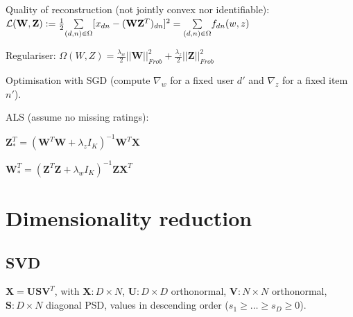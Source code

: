 Quality of reconstruction (not jointly convex nor identifiable):\newline $\mathcal{L}(\mathbf{W}, \mathbf{Z}) := \frac{1}{2} \underset{(d,n)\in \Omega}{\sum} [x_{dn} - (\mathbf{W}\mathbf{Z}^T)_{dn}]^2 \newline= \underset{(d,n)\in \Omega}{\sum} f_{dn}(w,z)$

Regulariser: $\Omega(W,Z) = \frac{\lambda_w}{2} ||\mathbf{W}||^2_{Frob} + \frac{\lambda_z}{2} ||\mathbf{Z}||^2_{Frob}$

Optimisation with SGD (compute $\nabla_w$ for a fixed user $d'$ and $\nabla_z$ for a fixed item $n'$). 

ALS (assume no missing ratings):

$\mathbf{Z}^T_* = (\mathbf{W}^T\mathbf{W} + \lambda_z I_K)^{-1} \mathbf{W}^T \mathbf{X}$

$\mathbf{W}^T_* = (\mathbf{Z}^T\mathbf{Z} + \lambda_w I_K)^{-1} \mathbf{Z} \mathbf{X}^T$


\section{Dimensionality reduction}
\subsection{SVD}
$\mathbf{X} = \mathbf{U} \mathbf{S} \mathbf{V}^T$, with $\mathbf{X}: D\times N$, $\mathbf{U}: D\times D$ orthonormal, $\mathbf{V}: N\times N$ orthonormal, $\mathbf{S}: D\times N$ diagonal PSD, values in descending order ($s_1 \ge \dots \ge s_D \ge 0$).

